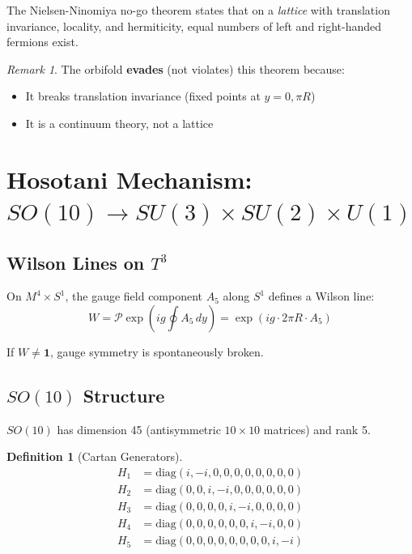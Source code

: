 \documentclass[12pt,a4paper]{article}
\theoremstyle{definition}
\newtheorem{definition}[theorem]{Definition}
\theoremstyle{remark}
\newtheorem{remark}[theorem]{Remark}
\newcommand{\diag}{\mathrm{diag}}
\begin{document}
The Nielsen-Ninomiya no-go theorem states that on a \emph{lattice} with translation invariance, locality, and hermiticity, equal numbers of left and right-handed fermions exist.

\begin{remark}
The orbifold \textbf{evades} (not violates) this theorem because:
\begin{itemize}
\item It breaks translation invariance (fixed points at $y = 0, \pi R$)
\item It is a continuum theory, not a lattice
\end{itemize}
\end{remark}

\section{Hosotani Mechanism: $SO(10) \to SU(3) \times SU(2) \times U(1)$}
\label{sec:hosotani}

\subsection{Wilson Lines on $T^3$}

On $M^4 \times S^1$, the gauge field component $A_5$ along $S^1$ defines a Wilson line:
\begin{equation}
W = \mathcal{P} \exp\left(ig \oint A_5 \, dy\right) = \exp(ig \cdot 2\pi R \cdot A_5)
\end{equation}

If $W \neq \mathbf{1}$, gauge symmetry is spontaneously broken.

\subsection{$SO(10)$ Structure}

$SO(10)$ has dimension 45 (antisymmetric $10 \times 10$ matrices) and rank 5.

\begin{definition}[Cartan Generators]
\begin{align}
H_1 &= \diag(i, -i, 0, 0, 0, 0, 0, 0, 0, 0) \\
H_2 &= \diag(0, 0, i, -i, 0, 0, 0, 0, 0, 0) \\
H_3 &= \diag(0, 0, 0, 0, i, -i, 0, 0, 0, 0) \\
H_4 &= \diag(0, 0, 0, 0, 0, 0, i, -i, 0, 0) \\
H_5 &= \diag(0, 0, 0, 0, 0, 0, 0, 0, i, -i)
\end{align}
\end{definition}
\end{document}
